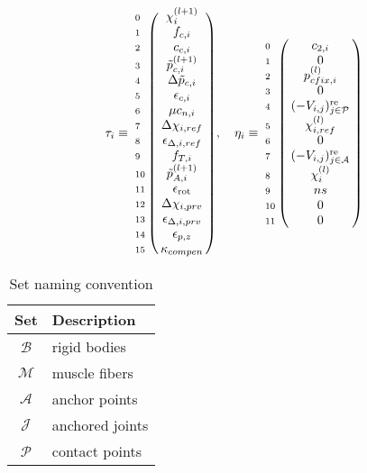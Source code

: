 \documentclass[a4paper,10pt]{article}
\begin{document}
\begin{equation}\notag
\tau_i \equiv
\bordermatrix {
                &                                     \cr
\scriptstyle{0} &  \chi^{(l+1)}_i                     \cr
\scriptstyle{1} &   f_{c,i}                           \cr
\scriptstyle{2} &   c_{c,i}                           \cr
\scriptstyle{3} &   \tilde{p}^{(l+1)}_{c,i}           \cr
\scriptstyle{4} &   \Delta \tilde{p}_{c,i}            \cr
\scriptstyle{5} &   \epsilon_{c,i}                    \cr
\scriptstyle{6} &   \mu c_{n,i}                    \cr
\scriptstyle{7} &   \Delta\chi_{i,ref}                \cr
\scriptstyle{8} &   \epsilon_{\Delta,i,ref}           \cr
\scriptstyle{9} &   f_{T,i}                           \cr
\scriptstyle{10}&   \tilde{p}^{(l+1)}_{A,i}           \cr
\scriptstyle{11}&   \epsilon_{\text{rot}}             \cr
\scriptstyle{12}&   \Delta\chi_{i,prv}               \cr
\scriptstyle{13} &   \epsilon_{\Delta,i,prv}          \cr
\scriptstyle{14} &   \epsilon_{p,z}          \cr
\scriptstyle{15} &   \kappa_{compen}
}
, \quad
\eta_i \equiv
\bordermatrix {
                &                                              \cr
\scriptstyle{0} &   c_{2,i}                                    \cr
\scriptstyle{1} &   0                                          \cr
\scriptstyle{2} &   p_{cfix, i}^{(l)}                          \cr
\scriptstyle{3} &   0                                          \cr
\scriptstyle{4} &   (-V_{i,j})_{j \in \mathcal{P}}^\text{re}   \cr
\scriptstyle{5} &   \chi^{(l)}_{i,ref}                         \cr
\scriptstyle{6} &   0                                          \cr
\scriptstyle{7} &   (-V_{i,j})_{j \in \mathcal{A}}^\text{re}      \cr
\scriptstyle{8} &   \chi^{(l)}_{i} \cr
\scriptstyle{9} &   ns \cr
\scriptstyle{10} &  0 \cr
\scriptstyle{11} &  0 \cr
}
\end{equation}

\begin{table}[h!b!p!]
\caption{Set naming convention}
\centering
\begin{tabular}{ c l }
\hline
Set              & Description                  \\
\hline
$\mathcal{B}$    & rigid bodies                 \\
$\mathcal{M}$    & muscle fibers                \\
$\mathcal{A}$    & anchor points                \\ 
$\mathcal{J}$    & anchored joints              \\
$\mathcal{P}$    & contact points               \\
\hline
\end{tabular}
\end{table}
\end{document}
